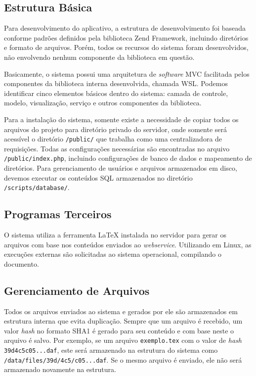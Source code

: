\documentclass{article}
\begin{document}
\subsection{Estrutura Básica}

Para desenvolvimento do aplicativo, a estrutura de desenvolvimento foi baseada
conforme padrões definidos pela biblioteca Zend Framework, incluindo diretórios
e formato de arquivos. Porém, todos os recursos do sistema foram desenvolvidos,
não envolvendo nenhum componente da biblioteca em questão.

Basicamente, o sistema possui uma arquitetura de \emph{software} MVC facilitada
pelos componentes da biblioteca interna desenvolvida, chamada WSL. Podemos
identificar cinco elementos básicos dentro do sistema: camada de controle,
modelo, visualização, serviço e outros componentes da biblioteca.

Para a instalação do sistema, somente existe a necessidade de copiar todos os
arquivos do projeto para diretório privado do servidor, onde somente será
acessível o diretório \texttt{/public/} que trabalha como uma centralizadora de
requisições. Todas as configurações necessárias são encontradas no arquivo
\texttt{/public/index.php}, incluindo configurações de banco de dados e
mapeamento de diretórios.  Para gerenciamento de usuários e arquivos armazenados
em disco, devemos executar os conteúdos SQL armazenados no diretório
\texttt{/scripts/database/}.

\subsection{Programas Terceiros}

O sistema utiliza a ferramenta \LaTeX{} instalada no servidor para gerar os
arquivos com base nos conteúdos enviados ao \emph{webservice}. Utilizando em
Linux, as execuções externas são solicitadas ao sistema operacional, compilando
o documento.

\subsection{Gerenciamento de Arquivos}

Todos os arquivos enviados ao sistema e gerados por ele são armazenados em
estrutura interna que evita duplicação. Sempre que um arquivo é recebido, um
valor \emph{hash} no formato SHA1 é gerado para seu conteúdo e com base neste o
arquivo é salvo. Por exemplo, se um arquivo \texttt{exemplo.tex} com o valor de
\emph{hash} \texttt{39d4c5c05...daf}, este será armazenado na estrutura do
sistema como \texttt{/data/files/39d/4c5/c05...daf}. Se o mesmo arquivo é
enviado, ele não será armazenado novamente na estrutura.
\end{document}
